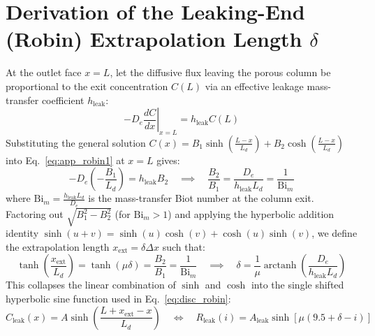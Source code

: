 \documentclass[11pt,a4paper]{article}
\begin{document}
\section{Derivation of the Leaking-End (Robin) Extrapolation Length $\delta$}
\label{app:robin}
At the outlet face $x = L$, let the diffusive flux leaving the porous column be proportional to the exit concentration $C(L)$ via an effective leakage mass-transfer coefficient $h_{\text{leak}}$:
\begin{equation}
    -D_e \left.\frac{dC}{dx}\right|_{x=L} = h_{\text{leak}} C(L)
    \label{eq:app_robin1}
\end{equation}
Substituting the general solution $C(x) = B_1 \sinh\left(\frac{L-x}{L_d}\right) + B_2 \cosh\left(\frac{L-x}{L_d}\right)$ into Eq.~\eqref{eq:app_robin1} at $x = L$ gives:
\begin{equation}
    -D_e \left(-\frac{B_1}{L_d}\right) = h_{\text{leak}} B_2 \quad \implies \quad \frac{B_2}{B_1} = \frac{D_e}{h_{\text{leak}} L_d} = \frac{1}{\text{Bi}_m}
\end{equation}
where $\text{Bi}_m = \frac{h_{\text{leak}} L_d}{D_e}$ is the mass-transfer Biot number at the column exit. Factoring out $\sqrt{B_1^2 - B_2^2}$ (for $\text{Bi}_m > 1$) and applying the hyperbolic addition identity $\sinh(u + v) = \sinh(u)\cosh(v) + \cosh(u)\sinh(v)$, we define the extrapolation length $x_{\text{ext}} = \delta \Delta x$ such that:
\begin{equation}
    \tanh\left(\frac{x_{\text{ext}}}{L_d}\right) = \tanh(\mu \delta) = \frac{B_2}{B_1} = \frac{1}{\text{Bi}_m} \quad \implies \quad \delta = \frac{1}{\mu}\operatorname{arctanh}\left(\frac{D_e}{h_{\text{leak}}L_d}\right)
\end{equation}
This collapses the linear combination of $\sinh$ and $\cosh$ into the single shifted hyperbolic sine function used in Eq.~\eqref{eq:disc_robin}:
\begin{equation}
    C_{\text{leak}}(x) = A \sinh\left(\frac{L + x_{\text{ext}} - x}{L_d}\right) \quad \Longleftrightarrow \quad R_{\text{leak}}(i) = A_{\text{leak}} \sinh\left[\mu(9.5 + \delta - i)\right]
\end{equation}
\end{document}
